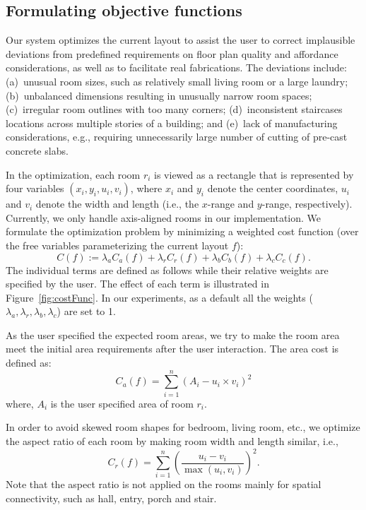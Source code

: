 \subsection{Formulating objective functions}

Our system optimizes the current layout to assist the user to correct implausible deviations from predefined requirements on floor plan quality and affordance considerations, as well as to facilitate real fabrications. The deviations include: (a)~unusual room sizes, such as relatively small living room or a large laundry; (b)~unbalanced dimensions resulting in unusually narrow room spaces; (c)~irregular room outlines with too many corners; (d)~inconsistent staircases locations across multiple stories of a building; and (e)~lack of manufacturing considerations, e.g., requiring unnecessarily large number of cutting of pre-cast concrete slabs.

In the optimization, each room $r_i$ is viewed as a rectangle that is represented by four variables $(x_i, y_i, u_i, v_i)$, where $x_i$ and $y_i$ denote the center coordinates, $u_i$ and $v_i$ denote the width and length (i.e., the $x$-range and $y$-range, respectively). Currently, we only handle axis-aligned rooms in our implementation. We formulate the optimization problem by minimizing a weighted cost function (over the free variables parameterizing the current layout $f$):
%
\begin{equation}\label{costFunction}
  C(f) := \lambda_a C_a(f) + \lambda_r C_r(f) + \lambda_b C_b(f) + \lambda_c C_c(f).
\end{equation}
%
The individual terms are defined as follows while their relative weights are specified by the user. The effect of each term is illustrated in Figure~\ref{fig:costFunc}. In our experiments, as a default all the weights ($\lambda_a,\lambda_r,\lambda_b,\lambda_c$) are set to 1.

As the user specified the expected room areas, we try to make the room area meet the initial area requirements after the user interaction. The area cost is defined as:
\begin{equation}\label{costArea}
C_a(f) = \sum_{i=1}^n (A_i - u_i \times v_i)^2
\end{equation}
where, $A_i$ is the user specified area of room $r_i$.

In order to avoid skewed room shapes for bedroom, living room, etc., we optimize the aspect ratio of each room by making room width and length similar, i.e.,
\begin{equation}\label{costAspect}
C_r(f) = \sum_{i=1}^n \left( \frac{u_i - v_i}{\max (u_i, v_i)} \right)^2.
\end{equation}
Note that the aspect ratio is not applied on the rooms mainly for spatial connectivity, such as hall, entry, porch and stair.

